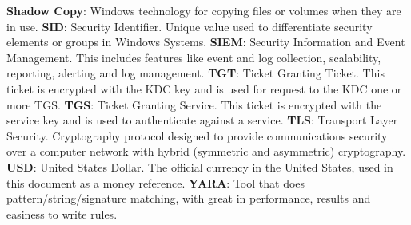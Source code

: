 \linej
\linej
\textbf{Shadow Copy}: Windows technology for copying files or volumes when they are in use.
\linej
\linej
\textbf{SID}: Security Identifier. Unique value used to differentiate security elements or groups in Windows Systems.
\linej
\linej
\textbf{SIEM}: Security Information and Event Management. This includes features like event and log collection, scalability, reporting, alerting and log management.
\linej
\linej
\textbf{TGT}: Ticket Granting Ticket. This ticket is encrypted with the KDC key and is used for request to the KDC one or more TGS.
\linej
\linej
\textbf{TGS}: Ticket Granting Service. This ticket is encrypted with the service key and is used to authenticate against a service.
\linej
\linej
\textbf{TLS}: Transport Layer Security. Cryptography protocol designed to provide communications security over a computer network with hybrid (symmetric and asymmetric) cryptography.
\linej
\linej
\textbf{USD}: United States Dollar. The official currency in the United States, used in this document as a money reference.
\linej
\linej
\textbf{YARA}: Tool that does pattern/string/signature matching, with great in performance, results and easiness to write rules.
\linej
\linej
